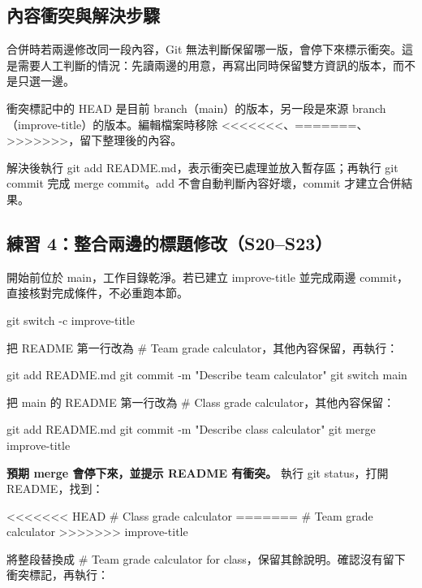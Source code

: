 \documentclass[11pt,a4paper]{article}
\DeclareRobustCommand{\code}[1]{{\small\ttfamily #1}}
\begin{document}
\subsection{內容衝突與解決步驟}

合併時若兩邊修改同一段內容，Git 無法判斷保留哪一版，會停下來標示衝突。這是需要人工判斷的情況：先讀兩邊的用意，再寫出同時保留雙方資訊的版本，而不是只選一邊。

衝突標記中的 \code{HEAD} 是目前 branch（\code{main}）的版本，另一段是來源 branch（\code{improve-title}）的版本。編輯檔案時移除 \code{<<<<<<<}、\code{=======}、\code{>>>>>>>}，留下整理後的內容。

解決後執行 \code{git add README.md}，表示衝突已處理並放入暫存區；再執行 \code{git commit} 完成 merge commit。\code{add} 不會自動判斷內容好壞，\code{commit} 才建立合併結果。

\subsection{練習 4：整合兩邊的標題修改（S20–S23）}

開始前位於 \code{main}，工作目錄乾淨。若已建立 \code{improve-title} 並完成兩邊 commit，直接核對完成條件，不必重跑本節。

\begin{Code}
git switch -c improve-title
\end{Code}

把 README 第一行改為 \code{\# Team grade calculator}，其他內容保留，再執行：

\begin{Code}
git add README.md
git commit -m "Describe team calculator"
git switch main
\end{Code}

把 \code{main} 的 README 第一行改為 \code{\# Class grade calculator}，其他內容保留：

\begin{Code}
git add README.md
git commit -m "Describe class calculator"
git merge improve-title
\end{Code}

\textbf{預期 \code{merge} 會停下來，並提示 README 有衝突。} 執行 \code{git status}，打開 README，找到：

\begin{Code}
<<<<<<< HEAD
# Class grade calculator
=======
# Team grade calculator
>>>>>>> improve-title
\end{Code}

將整段替換成 \code{\# Team grade calculator for class}，保留其餘說明。確認沒有留下衝突標記，再執行：
\end{document}
